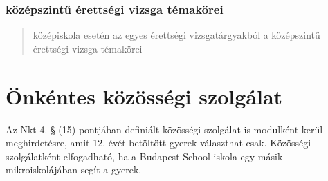 \subsubsection{középszintű érettségi vizsga témakörei}

\begin{quote}
      középiskola esetén az egyes érettségi vizsgatárgyakból a középszintű
      érettségi vizsga témakörei
\end{quote}


\section{Önkéntes közösségi
  szolgálat}\label{uxf6nkuxe9ntes-kuxf6zuxf6ssuxe9gi-szolguxe1lat}

Az Nkt 4. § (15) pontjában definiált közösségi szolgálat is modulként
kerül meghirdetésre, amit 12. évét betöltött gyerek választhat csak.
Közösségi szolgálatként elfogadható, ha a Budapest School iskola egy
másik mikroiskolájában segít a gyerek.
